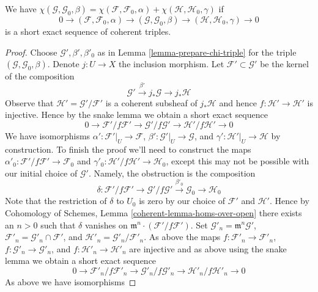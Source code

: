 \begin{lemma}
\label{lemma-ses-chi-triple}
We have
$\chi(\mathcal{G}, \mathcal{G}_0, \beta) =
\chi(\mathcal{F}, \mathcal{F}_0, \alpha) +
\chi(\mathcal{H}, \mathcal{H}_0, \gamma)$ if
$$
0 \to
(\mathcal{F}, \mathcal{F}_0, \alpha) \to
(\mathcal{G}, \mathcal{G}_0, \beta) \to
(\mathcal{H}, \mathcal{H}_0, \gamma)
\to 0
$$
is a short exact sequence of coherent triples.
\end{lemma}

\begin{proof}
Choose $\mathcal{G}', \beta', \beta'_0$ as in
Lemma \ref{lemma-prepare-chi-triple}
for the triple $(\mathcal{G}, \mathcal{G}_0, \beta)$.
Denote $j : U \to X$ the inclusion morphism.
Let $\mathcal{F}' \subset \mathcal{G}'$
be the kernel of the composition
$$
\mathcal{G}' \xrightarrow{\beta'} j_*\mathcal{G} \to j_*\mathcal{H}
$$
Observe that $\mathcal{H}' = \mathcal{G}'/\mathcal{F}'$
is a coherent subsheaf of $j_*\mathcal{H}$ and hence
$f : \mathcal{H}' \to \mathcal{H}'$ is injective.
Hence by the snake lemma we obtain a short exact sequence
$$
0 \to \mathcal{F}'/f\mathcal{F}' \to
\mathcal{G}'/f\mathcal{G}' \to
\mathcal{H}'/f\mathcal{H}' \to 0
$$
We have isomorphisms
$\alpha' : \mathcal{F}'|_U \to \mathcal{F}$,
$\beta' : \mathcal{G}'|_U \to \mathcal{G}$, and
$\gamma' : \mathcal{H}'|_U \to \mathcal{H}$ by construction.
To finish the proof we'll need to construct the maps
$\alpha'_0 : \mathcal{F}'/f\mathcal{F}' \to \mathcal{F}_0$ and
$\gamma'_0 : \mathcal{H}'/f\mathcal{H}' \to \mathcal{H}_0$, except
this may not be possible with our initial choice of $\mathcal{G}'$.
Namely, the obstruction is the composition
$$
\delta :
\mathcal{F}'/f\mathcal{F}' \to
\mathcal{G}'/f\mathcal{G}' \xrightarrow{\beta'_0}
\mathcal{G}_0 \to
\mathcal{H}_0
$$
Note that the restriction of $\delta$ to $U_0$ is zero
by our choice of $\mathcal{F}'$ and $\mathcal{H}'$.
Hence by
Cohomology of Schemes, Lemma \ref{coherent-lemma-homs-over-open}
there exists an $n > 0$ such that
$\delta$ vanishes on $\mathfrak m^n \cdot (\mathcal{F}'/f\mathcal{F}')$.
Set $\mathcal{G}'_n = \mathfrak m^n \mathcal{G}'$,
$\mathcal{F}'_n = \mathcal{G}'_n \cap \mathcal{F}'$, and
$\mathcal{H}'_n = \mathcal{G}'_n/\mathcal{F}'_n$.
As above the maps
$f : \mathcal{F}'_n \to \mathcal{F}'_n$,
$f : \mathcal{G}'_n \to \mathcal{G}'_n$, and
$f : \mathcal{H}'_n \to \mathcal{H}'_n$ are injective
and as above using the snake lemma we obtain a short exact
sequence
$$
0 \to \mathcal{F}'_n/f\mathcal{F}'_n \to
\mathcal{G}'_n/f\mathcal{G}'_n \to
\mathcal{H}'_n/f\mathcal{H}'_n \to 0
$$
As above we have isomorphisms

\end{proof}
